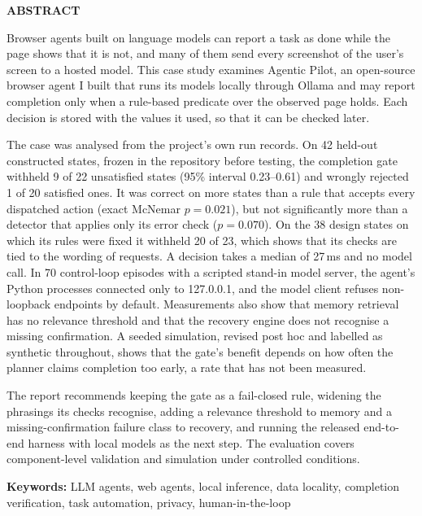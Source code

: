 {}
\begin{center}{\Large\bfseries ABSTRACT\par}\end{center}
\vspace{6pt}
Browser agents built on language models can report a task as done while the page shows that it is not, and many of them send every screenshot of the user's screen to a hosted model. This case study examines Agentic Pilot, an open-source browser agent I built that runs its models locally through Ollama and may report completion only when a rule-based predicate over the observed page holds. Each decision is stored with the values it used, so that it can be checked later.

The case was analysed from the project's own run records. On 42 held-out constructed states, frozen in the repository before testing, the completion gate withheld 9 of 22 unsatisfied states (95\% interval 0.23--0.61) and wrongly rejected 1 of 20 satisfied ones. It was correct on more states than a rule that accepts every dispatched action (exact McNemar $p=0.021$), but not significantly more than a detector that applies only its error check ($p=0.070$). On the 38 design states on which its rules were fixed it withheld 20 of 23, which shows that its checks are tied to the wording of requests. A decision takes a median of 27\,ms and no model call. In 70 control-loop episodes with a scripted stand-in model server, the agent's Python processes connected only to 127.0.0.1, and the model client refuses non-loopback endpoints by default. Measurements also show that memory retrieval has no relevance threshold and that the recovery engine does not recognise a missing confirmation. A seeded simulation, revised post hoc and labelled as synthetic throughout, shows that the gate's benefit depends on how often the planner claims completion too early, a rate that has not been measured.

The report recommends keeping the gate as a fail-closed rule, widening the phrasings its checks recognise, adding a relevance threshold to memory and a missing-confirmation failure class to recovery, and running the released end-to-end harness with local models as the next step. The evaluation covers component-level validation and simulation under controlled conditions.

\vspace{8pt}
\noindent\textbf{Keywords:} LLM agents, web agents, local inference, data locality, completion verification, task automation, privacy, human-in-the-loop
\clearpage

